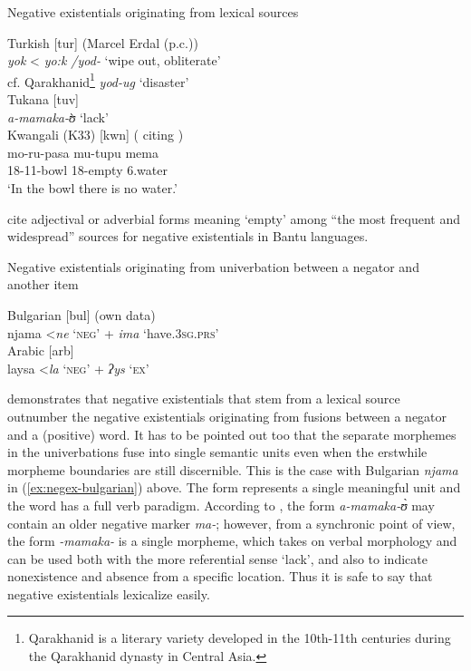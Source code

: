 \documentclass[output=paper,chinesefont,colorlinks,citecolor=brown]{langscibook}
\begin{document}
\begin{exe}
\ex Negative existentials originating from lexical sources \label{ex:negex-diach1}
\begin{xlist}
\ex Turkish [tur] (Marcel Erdal (p.c.)) \label{ex:turkish-hist}\\
\textit{yok} < \textit{yo:k /yod-} ‘wipe out, obliterate’\\cf. Qarakhanid\footnote{Qarakhanid is a literary variety developed in the 10th-11th centuries during the Qarakhanid dynasty in Central Asia.} \textit{yod-ug} ‘disaster’\\
\ex Tukana [tuv] \citep[455]{dimmendaalTurkanaLanguage1983} \label{ex:turkana-diach}\\
\textit{a-mamaka-ʊ}̀ ‘lack’\\
\ex Kwangali (K33) [kwn] ( citing \citet[108]{Dammann1957}) \label{ex:kwangali-hist}\\
\gll mo-ru-pasa m{\op}u{\cp}-tupu mema\\ 
18-11-bowl 18-empty 6.water\\
\glt `In the bowl there is no water.'
\end{xlist}
\end{exe}
 cite adjectival or adverbial forms meaning ‘empty’ among “the most frequent and widespread” sources for negative existentials in Bantu languages.

\begin{exe}
\ex Negative existentials originating from univerbation between a negator and another item \label{ex:negex-diach2}
\begin{xlist}
\ex Bulgarian [bul] (own data) \label{ex:negex-bulgarian}\\
njama \textless \textit{ne} `\textsc{neg}’ + \textit{ima} `have.\textsc{3sg.prs}’\\
\ex Arabic [arb]  \label{ex:negex-arabic}\\
laysa \textless \textit{la} ‘\textsc{neg}’ + \textit{ʔys} ‘\textsc{ex}’\\
\end{xlist}
\end{exe}
\citet[137]{Veselinova2013} demonstrates that negative existentials that stem from a lexical source outnumber the negative existentials originating from fusions between a negator and a (positive) word. It has to be pointed out too that the separate morphemes in the univerbations fuse into single semantic units even when the erstwhile morpheme boundaries are still discernible. This is the case with Bulgarian \textit{njama} in (\ref{ex:negex-bulgarian}) above. The form represents a single meaningful unit and the word has a full verb paradigm. According to \citet[455]{dimmendaalTurkanaLanguage1983}, the form \textit{a-mamaka-ʊ̀} may contain an older negative marker \textit{ma-}; however, from a synchronic point of view, the form \textit{-mamaka-} is a single morpheme, which takes on verbal morphology and can be used both with the more referential sense ‘lack’, and also to indicate nonexistence and absence from a specific location. Thus it is safe to say that negative existentials lexicalize easily. 
\end{document}

